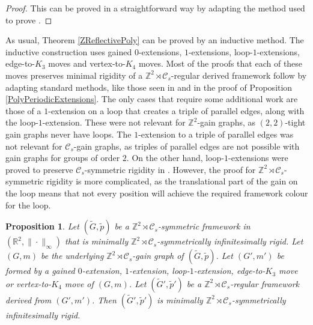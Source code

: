 \documentclass[reqno,a4paper,10pt]{article}
\newtheorem{proposition}[theorem]{Proposition}
\theoremstyle{definition}
\theoremstyle{remark}
\numberwithin{equation}{section}
\numberwithin{figure}{section}
\numberwithin{table}{section}
\newcommand{\R}{\mathbb{R}}
\newcommand{\Z}{\mathbb{Z}}
\newcommand{\G}{\tilde{G}}
\newcommand{\p}{\tilde{p}}
\begin{document}
    \begin{proof}
        This can be proved in a straightforward way by adapting the method used to prove \cite[Theorem 15]{GridLike}.
    \end{proof}
    As usual, Theorem \ref{ZReflectivePoly} can be proved by an inductive method. The inductive construction uses gained $0$-extensions, $1$-extensions, loop-$1$-extensions, edge-to-$K_3$ moves and vertex-to-$K_4$ moves. Most of the proofs that each of these moves preserves minimal rigidity of a $\Z^2\rtimes\mathcal{C}_s$-regular derived framework follow by adapting standard methods, like those seen in \cite[Theorem 22]{GridLike} and in the proof of Proposition \ref{PolyPeriodicExtensions}. The only cases that require some additional work are those of a $1$-extension on a loop that creates a triple of parallel edges, along with the loop-$1$-extension.
    These were not relevant for $\Z^2$-gain graphs, as $(2,2)$-tight gain graphs never have loops. The $1$-extension to a triple of parallel edges was not relevant for $\mathcal{C}_s$-gain graphs, as triples of parallel edges are not possible with gain graphs for groups of order $2$. On the other hand, loop-$1$-extensions were proved to preserve $\mathcal{C}_s$-symmetric rigidity in \cite[Theorem 22]{GridLike}. However, the proof for $\Z^2\rtimes\mathcal{C}_s$-symmetric rigidity is more complicated, as the translational part of the gain on the loop means that not every position will achieve the required framework colour for the loop.
    \begin{proposition}\label{PolyPeriodicCsExtensions}
		Let $(\G,\p)$ be a $\Z^2\rtimes\mathcal{C}_s$-symmetric framework in $(\R^2,\|\cdot\|_{\infty})$ that is minimally $\Z^2\rtimes\mathcal{C}_s$-symmetrically infinitesimally rigid. Let $(G,m)$ be the underlying $\Z^2\rtimes\mathcal{C}_s$-gain graph of $(\G,\p)$. Let $(G',m')$ be formed by a gained $0$-extension, $1$-extension, loop-$1$-extension, edge-to-$K_3$ move or vertex-to-$K_4$ move of $(G,m)$. Let $(\G',\p')$ be a $\Z^2\rtimes\mathcal{C}_s$-regular framework derived from $(G',m')$. Then $(\G',\p')$ is minimally $\Z^2\rtimes\mathcal{C}_s$-symmetrically infinitesimally rigid.
	\end{proposition}
\end{document}
